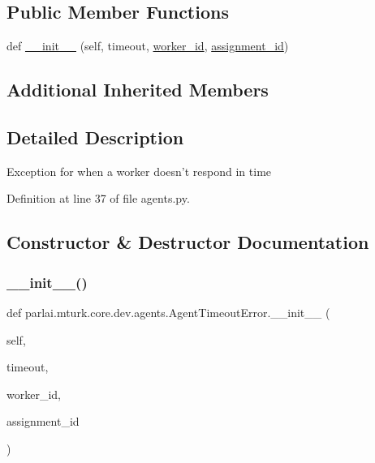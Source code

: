 \subsection*{Public Member Functions}
\begin{DoxyCompactItemize}
\item 
def \hyperlink{classparlai_1_1mturk_1_1core_1_1dev_1_1agents_1_1AgentTimeoutError_a392dd43c67cbfc005555e5bca543cf8b}{\+\_\+\+\_\+init\+\_\+\+\_\+} (self, timeout, \hyperlink{classparlai_1_1mturk_1_1core_1_1dev_1_1agents_1_1AbsentAgentError_a26db50c87a5d4954907d538de3da875c}{worker\+\_\+id}, \hyperlink{classparlai_1_1mturk_1_1core_1_1dev_1_1agents_1_1AbsentAgentError_ab9cf020196d28024b307c41a3fff6be1}{assignment\+\_\+id})
\end{DoxyCompactItemize}
\subsection*{Additional Inherited Members}


\subsection{Detailed Description}
\begin{DoxyVerb}Exception for when a worker doesn't respond in time\end{DoxyVerb}
 

Definition at line 37 of file agents.\+py.



\subsection{Constructor \& Destructor Documentation}
\mbox{\label{classparlai_1_1mturk_1_1core_1_1dev_1_1agents_1_1AgentTimeoutError_a392dd43c67cbfc005555e5bca543cf8b}} 
\subsubsection{\texorpdfstring{\+\_\+\+\_\+init\+\_\+\+\_\+()}{\_\_init\_\_()}}
{\footnotesize\ttfamily def parlai.\+mturk.\+core.\+dev.\+agents.\+Agent\+Timeout\+Error.\+\_\+\+\_\+init\+\_\+\+\_\+ (\begin{DoxyParamCaption}\item[{}]{self,  }\item[{}]{timeout,  }\item[{}]{worker\+\_\+id,  }\item[{}]{assignment\+\_\+id }\end{DoxyParamCaption})}



